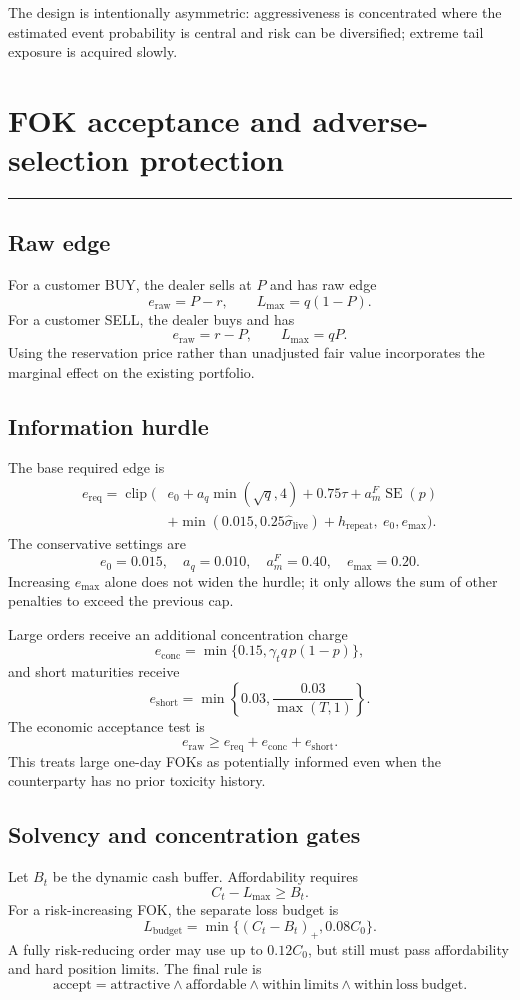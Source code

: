 \documentclass[10pt,a4paper]{article}
\newcommand{\clip}{\operatorname{clip}}
\newcommand{\1}{\mathbf{1}}
\newcommand{\sectionrule}{\vspace{-2pt}\noindent\color{navy}\rule{\textwidth}{0.7pt}\color{black}\vspace{2pt}}
\begin{document}
The design is intentionally asymmetric: aggressiveness is concentrated where the
estimated event probability is central and risk can be diversified; extreme tail
exposure is acquired slowly.

\clearpage

\section{FOK acceptance and adverse-selection protection}
\sectionrule

\subsection{Raw edge}
For a customer BUY, the dealer sells at $P$ and has raw edge
\[
 e_{\mathrm{raw}}=P-r,\qquad L_{\max}=q(1-P).
\]
For a customer SELL, the dealer buys and has
\[
 e_{\mathrm{raw}}=r-P,\qquad L_{\max}=qP.
\]
Using the reservation price rather than unadjusted fair value incorporates the marginal
effect on the existing portfolio.

\subsection{Information hurdle}
The base required edge is
\[
\begin{aligned}
 e_{\mathrm{req}}=\clip\bigl(&e_0
 +a_q\min(\sqrt q,4)
 +0.75\tau
 +a_m^{F}\operatorname{SE}(p)\\
 &+\min(0.015,0.25\widehat\sigma_{\mathrm{live}})
 +h_{\mathrm{repeat}},\ e_0,e_{\max}\bigr).
\end{aligned}
\]
The conservative settings are
\[
 e_0=0.015,\quad a_q=0.010,\quad a_m^F=0.40,\quad e_{\max}=0.20.
\]
Increasing $e_{\max}$ alone does not widen the hurdle; it only allows the sum of
other penalties to exceed the previous cap.

Large orders receive an additional concentration charge
\[
 e_{\mathrm{conc}}=\min\{0.15,\gamma_tq\,p(1-p)\},
\]
and short maturities receive
\[
 e_{\mathrm{short}}=\min\left\{0.03,
 \frac{0.03}{\max(T,1)}\right\}.
\]
The economic acceptance test is
\[
 e_{\mathrm{raw}}\ge e_{\mathrm{req}}+e_{\mathrm{conc}}+e_{\mathrm{short}}.
\]
This treats large one-day FOKs as potentially informed even when the counterparty has
no prior toxicity history.

\subsection{Solvency and concentration gates}
Let $B_t$ be the dynamic cash buffer.  Affordability requires
\[
 C_t-L_{\max}\ge B_t.
\]
For a risk-increasing FOK, the separate loss budget is
\[
 L_{\mathrm{budget}}
 =\min\{(C_t-B_t)_+,0.08C_0\}.
\]
A fully risk-reducing order may use up to $0.12C_0$, but still must pass affordability
and hard position limits.  The final rule is
\[
 \boxed{\mathrm{accept}=\mathrm{attractive}\wedge\mathrm{affordable}
 \wedge\mathrm{within\ limits}\wedge\mathrm{within\ loss\ budget}.}
\]
\end{document}
